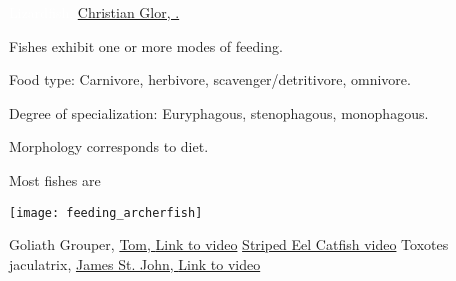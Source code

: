 \label{key}\documentclass[t]{beamer}
\begin{document}

{
\begin{frame}[plain]

\vfill

\tinyfill\textcolor{white}{Lizardfish, \href{https://www.flickr.com/photos/76738608@N08/14220084406}{Christian Glor, .}}

\end{frame}
}


\begin{frame}[t,plain]{Fishes exhibit one or more modes of feeding.}

\hangpara Food type: 
	\newline \hspace*{1em} Carnivore, herbivore, scavenger/detritivore, omnivore.

\hangpara Degree of specialization:
	\newline \hspace*{1em} Euryphagous, stenophagous, monophagous.

\hangpara Morphology corresponds to diet.

\end{frame}





\begin{frame}[t,plain]{Most fishes are }

\begin{multicols}{2}


\columnbreak

\texttt{[image: feeding\_archerfish]}

\end{multicols}
	
\vfilll

\tiny Goliath Grouper, \href{https://www.flickr.com/photos/47445767@N05/15534079567}{Tom, } \href{https://www.youtube.com/watch?v=xGc2T0iJTFw}{Link to video} 
\hfill 
\href{https://www.youtube.com/watch?v=LuXNIaEqNiw}{Striped Eel Catfish video}
\hfill
Toxotes jaculatrix, \href{https://www.flickr.com/photos/47445767@N05/15534079567}{James St. John, } \href{https://www.youtube.com/watch?v=0Q3jIXpeae4}{Link to video}
	
\end{frame}
\end{document}
